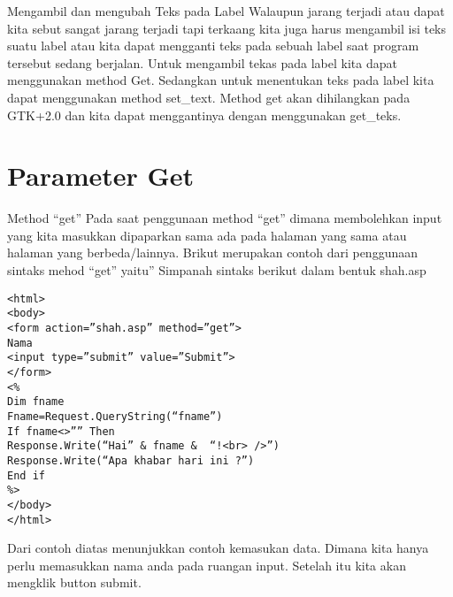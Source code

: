 Mengambil dan mengubah Teks pada Label
Walaupun jarang terjadi atau dapat kita sebut sangat jarang terjadi tapi terkaang kita juga harus mengambil isi teks suatu label atau 
kita dapat mengganti teks pada sebuah label saat program tersebut sedang berjalan.
Untuk mengambil tekas pada label kita dapat menggunakan method Get. Sedangkan untuk menentukan teks pada label kita dapat menggunakan 
method set_text. 
Method get akan dihilangkan pada GTK+2.0 dan kita dapat menggantinya dengan menggunakan get_teks.

\section{Parameter Get}
Method “get”
Pada saat penggunaan method “get” dimana membolehkan input yang kita masukkan dipaparkan sama ada pada halaman yang sama atau halaman 
 yang berbeda/lainnya. Brikut merupakan contoh dari penggunaan sintaks mehod “get” yaitu”
Simpanah sintaks berikut dalam bentuk shah.asp
\begin{verbatim}
<html>
<body>
<form action=”shah.asp” method=”get”>
Nama
<input type=”submit” value=”Submit”>
</form>
<%
Dim fname
Fname=Request.QueryString(“fname”)
If fname<>”” Then
Response.Write(“Hai” & fname &  “!<br> />”)
Response.Write(“Apa khabar hari ini ?”)
End if
%>
</body>
</html>
\end{verbatim}

Dari contoh diatas menunjukkan contoh kemasukan data. Dimana kita hanya perlu memasukkan nama anda pada ruangan input. Setelah itu kita 
akan mengklik button submit.

